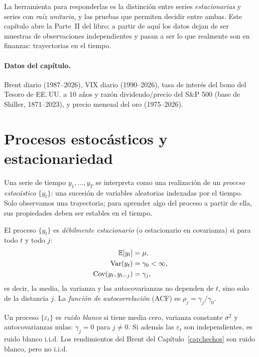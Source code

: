 La herramienta para responderlas es la distinción entre series \emph{estacionarias} y series con
\emph{raíz unitaria}, y las pruebas que permiten decidir entre ambas. Este capítulo abre la Parte~II del
libro: a partir de aquí los datos dejan de ser muestras de observaciones independientes y pasan a ser lo
que realmente son en finanzas: trayectorias en el tiempo.

\paragraph{Datos del capítulo.} Brent diario (1987--2026), VIX diario (1990--2026), tasa de interés del bono
del Tesoro de EE.\,UU. a 10 años y razón dividendo/precio del S\&P 500 (base de Shiller, 1871--2023), y
precio mensual del oro (1975--2026).

\section{Procesos estocásticos y estacionariedad}

Una serie de tiempo $y_1,\dots,y_T$ se interpreta como una realización de un \emph{proceso estocástico}
$\{y_t\}$: una sucesión de variables aleatorias indexadas por el tiempo. Solo observamos una trayectoria;
para aprender algo del proceso a partir de ella, sus propiedades deben ser estables en el tiempo.

\begin{definicion}
El proceso $\{y_t\}$ es \emph{débilmente estacionario} (o estacionario en covarianza) si para todo $t$ y todo
$j$:
\begin{align*}
  \mathbb{E}[y_t]            &= \mu,\\
  \operatorname{Var}(y_t)          &= \gamma_0<\infty,\\
  \operatorname{Cov}(y_t,y_{t-j})  &= \gamma_j,
\end{align*}
es decir, la media, la varianza y las autocovarianzas no dependen de $t$, sino solo de la distancia $j$.
La \emph{función de autocorrelación} (ACF) es $\rho_j=\gamma_j/\gamma_0$.
\end{definicion}

\begin{definicion}
Un proceso $\{\varepsilon_t\}$ es \emph{ruido blanco} si tiene media cero, varianza constante $\sigma^2$ y
autocovarianzas nulas: $\gamma_j=0$ para $j\ne0$. Si además las $\varepsilon_t$ son independientes, es ruido
blanco i.i.d. Los rendimientos del Brent del Capítulo~\ref{cap:hechos} son ruido blanco, pero no i.i.d.
\end{definicion}

